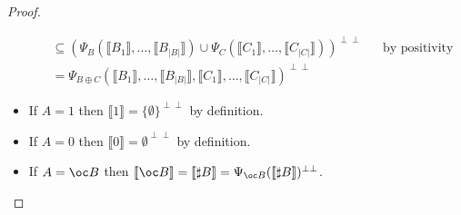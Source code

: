 \documentclass[11pt]{article}
\newcommand\size[1]{{\lvert #1 \rvert}}
\newcommand\sem[1]{{\llbracket #1 \rrbracket}}
\newcommand\biperp{{\perp\perp}}
\begin{document}
\begin{proof}
\begin{itemize}
\begin{align*}
            &\subseteq (\Psi_B(\sem{B_1}, \dots, \sem{B_\size{B}}) \cup \Psi_C(\sem{C_1}, \dots, \sem{C_\size{C}}))^\biperp &&\text{by positivity} \\
            &= \Psi_{B \oplus C}(\sem{B_1}, \dots, \sem{B_\size{B}}, \sem{C_1}, \dots, \sem{C_\size{C}})^\biperp
        \end{align*}
        \item If $A = 1$ then $\sem{1} = \{\emptyset\}^\biperp$ by definition.
        \item If $A = 0$ then $\sem{0} = \emptyset^\biperp$ by definition.
        \item If $A = \oc B$ then $\sem{\oc B} = \sem{\sharp B} = \Psi_{\oc B}(\sem{\sharp B})^\biperp$.
    \end{itemize}
\end{proof}
\end{document}
